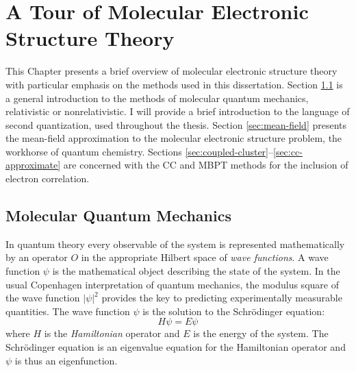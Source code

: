 
\renewcommand{\thefigure}{\arabic{chapter}.\arabic{figure}}

\chapter{A Tour of Molecular Electronic Structure Theory}\label{ch:QM}

This Chapter presents a brief overview of molecular electronic structure
theory with particular emphasis on the methods used in this dissertation.
Section \ref{sec:mqm} is a general introduction to the methods of
molecular quantum mechanics, relativistic or nonrelativistic.
I will provide a brief introduction to the language of second
quantization, used throughout the thesis.
Section \ref{sec:mean-field} presents the mean-field approximation to
the molecular electronic structure problem, the workhorse of quantum
chemistry.
Sections \ref{sec:coupled-cluster}--\ref{sec:cc-approximate} are
concerned with the \gls{CC} and \gls{MBPT} methods for the inclusion of
electron correlation.

\section{Molecular Quantum Mechanics}\label{sec:mqm}

 In quantum theory every observable of the
system is represented mathematically by an operator $O$ in the
appropriate Hilbert space of \emph{wave functions}.
A wave function $\psi$ is the mathematical object describing the state of the
system. In the usual Copenhagen interpretation of quantum mechanics, the
modulus square of the wave function $|\psi|^2$ provides the key to
predicting experimentally measurable quantities.\autocite{Konishi2009-zb}
The wave function $\psi$ is the solution to the Schr\"{o}dinger equation:
\begin{equation}\label{eq:schrodinger}
  H\psi = E\psi
\end{equation}
where $H$ is the \emph{Hamiltonian} operator and $E$ is the energy of
the system. The Schr\"{o}dinger equation is an eigenvalue equation for
the Hamiltonian operator and $\psi$ is thus an
eigenfunction.\autocite{Arfken2013-pt}

